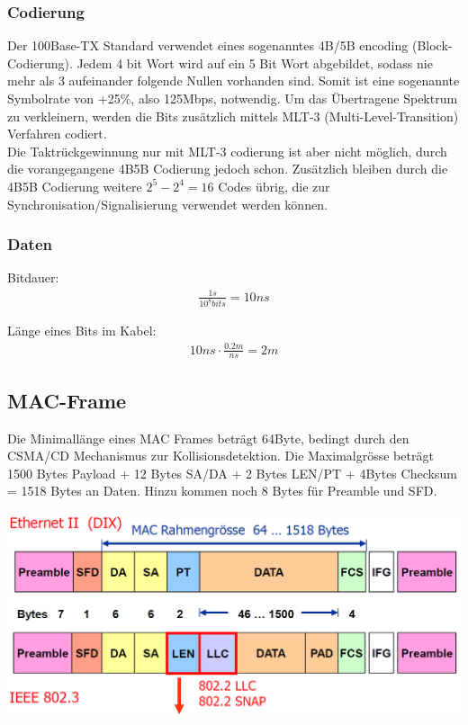 \subsubsection{Codierung}
Der 100Base-TX Standard verwendet eines sogenanntes 4B/5B encoding (Block-Codierung). Jedem 4 bit Wort wird auf ein 5 Bit Wort abgebildet, sodass nie mehr als 3 aufeinander folgende Nullen vorhanden sind. Somit ist eine sogenannte Symbolrate von +25\%, also 125Mbps, notwendig.
Um das Übertragene Spektrum zu verkleinern, werden die Bits zusätzlich mittels MLT-3 (Multi-Level-Transition) Verfahren codiert.\\
Die Taktrückgewinnung nur mit MLT-3 codierung ist aber nicht möglich, durch die vorangegangene 4B5B Codierung jedoch schon. Zusätzlich bleiben durch die 4B5B Codierung weitere $2^5-2^4=16$ Codes übrig, die zur Synchronisation/Signalisierung verwendet werden können.


\subsubsection{Daten}
Bitdauer:
\begin{align*}
\frac{1s}{10^{8}bits} = 10ns
\end{align*}

Länge eines Bits im Kabel:
\begin{align}
10ns \cdot \frac{0.2m}{ns} = 2m
\end{align}

\subsection{MAC-Frame}
Die Minimallänge eines MAC Frames beträgt 64Byte, bedingt durch den CSMA/CD Mechanismus zur Kollisionsdetektion.
Die Maximalgrösse beträgt 1500 Bytes Payload + 12 Bytes SA/DA + 2 Bytes LEN/PT + 4Bytes Checksum = 1518 Bytes an Daten. Hinzu kommen noch 8 Bytes für Preamble und SFD.

\includegraphics[scale=0.5]{media/MACFrame.png}

